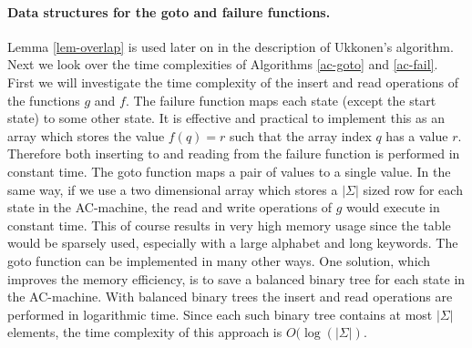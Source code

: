 \documentclass[english,twoside,censored,csm,algorithms-track-2020]{HYthesisML}
\theoremstyle{plain}
\theoremstyle{definition}
\numberwithin{testexample}{chapter}
\begin{document}
\paragraph{Data structures for the goto and failure functions.}
Lemma \ref{lem-overlap} is used later on in the description of Ukkonen's algorithm. Next we look
over the time complexities of Algorithms \ref{ac-goto} and \ref{ac-fail}. First we will investigate
the time complexity of the insert and read operations of the functions $g$ and $f$. The failure
function maps each state (except the start state) to some other state. It is effective and practical
to implement this as an array which stores the value $f(q)=r$ such that the array index $q$ has
a value $r$. Therefore both inserting to and reading from the failure function is performed
in constant time. The goto function maps a pair of values to a single value.
In the same way, if we use a two dimensional array which stores
a $|\Sigma|$ sized row for each state in the AC-machine, the read and write operations of $g$ would
execute in constant time. This of course results in very high memory usage since the table would be
sparsely used, especially with a large alphabet and long keywords. The goto function can
be implemented in many other ways. One solution, which improves the memory efficiency, is to save
a balanced binary tree for each state in the AC-machine. With balanced binary trees the insert and read
operations are performed in logarithmic time. Since each such binary tree contains at most $|\Sigma|$
elements, the time complexity of this approach is $O(\log(|\Sigma|)$.
\end{document}
